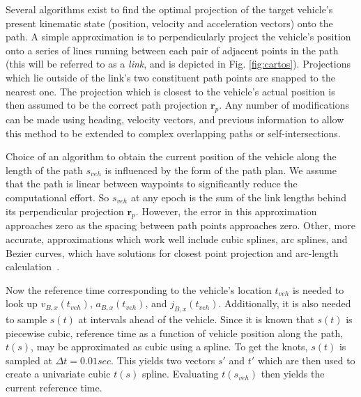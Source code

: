 \documentclass[letterpaper, 10 pt, conference]{ieeeconf}  %
\begin{document}

Several algorithms exist to find the optimal projection of the target vehicle's present kinematic state (position, velocity and acceleration vectors) onto the path.
A simple approximation is to perpendicularly project the vehicle's position onto a series of lines running between each pair of adjacent points in the path (this will be referred to as a {\it link}, and is depicted in Fig. \ref{fig:cartos}).
Projections which lie outside of the link's two constituent path points are snapped to the nearest one.
The projection which is closest to the vehicle's actual position is then assumed to be the correct path projection $\mathbf{r}_p$.
Any number of modifications can be made using heading, velocity vectors, and previous information to allow this method to be extended to complex overlapping paths or self-intersections.

Choice of an algorithm to obtain the current position of the vehicle along the length of the path $s_{veh}$ is influenced by the form of the path plan.
We assume that the path is linear between waypoints to significantly reduce the computational effort.
So $s_{veh}$ at any epoch is the sum of the link lengths behind its perpendicular projection $\mathbf{r}_p$.
However, the error in this approximation approaches zero as the spacing between path points approaches zero.
Other, more accurate, approximations which work well include cubic splines, arc splines, and Bezier curves, which have solutions for closest point projection and arc-length calculation~\cite{Wang2002,Wang2003,Schindler2011}.

Now the reference time corresponding to the vehicle's location $t_{veh}$ is needed to look up $v_{B,x}(t_{veh})$, $a_{B,x}(t_{veh})$, and $j_{B,x}(t_{veh})$.
Additionally, it is also needed to sample $s(t)$ at intervals ahead of the vehicle.
Since it is known that $s(t)$ is piecewise cubic, reference time as a function of vehicle position along the path, $t(s)$, may be approximated as cubic using a spline.
To get the knots, $s(t)$ is sampled at $\Delta t = 0.01 sec$.
This yields two vectors $s'$ and $t'$ which are then used to create a univariate cubic $t(s)$ spline.
Evaluating $t(s_{veh})$ then yields the current reference time.

\end{document}
